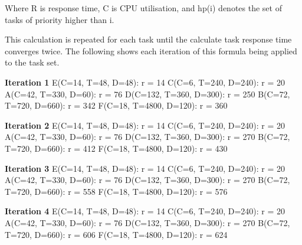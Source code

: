 \documentclass[]{report}
\begin{document}
			Where R is response time, C is CPU utilisation, and hp(i) denotes the set of tasks of priority higher than i.

			This calculation is repeated for each task until the calculate task response time converges twice. The following shows each iteration of this formula being applied to the task set.
			\medskip

			\textbf{Iteration 1} \newline
			E(C=14, T=48, D=48): r = 14 \newline
			C(C=6, T=240, D=240): r = 20 \newline
			A(C=42, T=330, D=60): r = 76 \newline
			D(C=132, T=360, D=300): r = 250 \newline
			B(C=72, T=720, D=660): r = 342 \newline
			F(C=18, T=4800, D=120): r = 360 \newline
	
			\textbf{Iteration 2} \newline
			E(C=14, T=48, D=48): r = 14 \newline
			C(C=6, T=240, D=240): r = 20 \newline
			A(C=42, T=330, D=60): r = 76 \newline
			D(C=132, T=360, D=300): r = 270 \newline
			B(C=72, T=720, D=660): r = 412 \newline
			F(C=18, T=4800, D=120): r = 430 \newline
	
			\textbf{Iteration 3} \newline
			E(C=14, T=48, D=48): r = 14 \newline
			C(C=6, T=240, D=240): r = 20 \newline
			A(C=42, T=330, D=60): r = 76 \newline
			D(C=132, T=360, D=300): r = 270 \newline
			B(C=72, T=720, D=660): r = 558 \newline
			F(C=18, T=4800, D=120): r = 576 \newline
	
			\textbf{Iteration 4} \newline
			E(C=14, T=48, D=48): r = 14 \newline
			C(C=6, T=240, D=240): r = 20 \newline
			A(C=42, T=330, D=60): r = 76 \newline
			D(C=132, T=360, D=300): r = 270 \newline
			B(C=72, T=720, D=660): r = 606 \newline
			F(C=18, T=4800, D=120): r = 624 \newline
	
\end{document}
